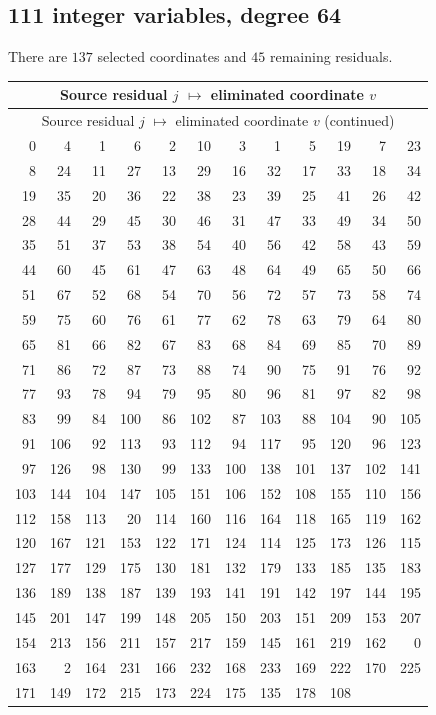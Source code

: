 \documentclass[11pt,letterpaper]{article}
\theoremstyle{definition}
\theoremstyle{remark}
\begin{document}
\subsection{111 integer variables, degree 64}
There are $137$ selected coordinates and $45$ remaining residuals.
\begingroup
\small
\setlength{\tabcolsep}{4pt}
\begin{longtable}{*{6}{r@{\,$\mapsto$\,}r}}
\hline
\multicolumn{12}{c}{Source residual $j$ $\mapsto$ eliminated coordinate $v$}\\
\hline
\endfirsthead
\hline
\multicolumn{12}{c}{Source residual $j$ $\mapsto$ eliminated coordinate $v$ (continued)}\\
\hline
\endhead
0 & 4 & 1 & 6 & 2 & 10 & 3 & 1 & 5 & 19 & 7 & 23 \\
8 & 24 & 11 & 27 & 13 & 29 & 16 & 32 & 17 & 33 & 18 & 34 \\
19 & 35 & 20 & 36 & 22 & 38 & 23 & 39 & 25 & 41 & 26 & 42 \\
28 & 44 & 29 & 45 & 30 & 46 & 31 & 47 & 33 & 49 & 34 & 50 \\
35 & 51 & 37 & 53 & 38 & 54 & 40 & 56 & 42 & 58 & 43 & 59 \\
44 & 60 & 45 & 61 & 47 & 63 & 48 & 64 & 49 & 65 & 50 & 66 \\
51 & 67 & 52 & 68 & 54 & 70 & 56 & 72 & 57 & 73 & 58 & 74 \\
59 & 75 & 60 & 76 & 61 & 77 & 62 & 78 & 63 & 79 & 64 & 80 \\
65 & 81 & 66 & 82 & 67 & 83 & 68 & 84 & 69 & 85 & 70 & 89 \\
71 & 86 & 72 & 87 & 73 & 88 & 74 & 90 & 75 & 91 & 76 & 92 \\
77 & 93 & 78 & 94 & 79 & 95 & 80 & 96 & 81 & 97 & 82 & 98 \\
83 & 99 & 84 & 100 & 86 & 102 & 87 & 103 & 88 & 104 & 90 & 105 \\
91 & 106 & 92 & 113 & 93 & 112 & 94 & 117 & 95 & 120 & 96 & 123 \\
97 & 126 & 98 & 130 & 99 & 133 & 100 & 138 & 101 & 137 & 102 & 141 \\
103 & 144 & 104 & 147 & 105 & 151 & 106 & 152 & 108 & 155 & 110 & 156 \\
112 & 158 & 113 & 20 & 114 & 160 & 116 & 164 & 118 & 165 & 119 & 162 \\
120 & 167 & 121 & 153 & 122 & 171 & 124 & 114 & 125 & 173 & 126 & 115 \\
127 & 177 & 129 & 175 & 130 & 181 & 132 & 179 & 133 & 185 & 135 & 183 \\
136 & 189 & 138 & 187 & 139 & 193 & 141 & 191 & 142 & 197 & 144 & 195 \\
145 & 201 & 147 & 199 & 148 & 205 & 150 & 203 & 151 & 209 & 153 & 207 \\
154 & 213 & 156 & 211 & 157 & 217 & 159 & 145 & 161 & 219 & 162 & 0 \\
163 & 2 & 164 & 231 & 166 & 232 & 168 & 233 & 169 & 222 & 170 & 225 \\
171 & 149 & 172 & 215 & 173 & 224 & 175 & 135 & 178 & 108 & \multicolumn{2}{c}{} \\
\hline
\end{longtable}
\endgroup
\end{document}
